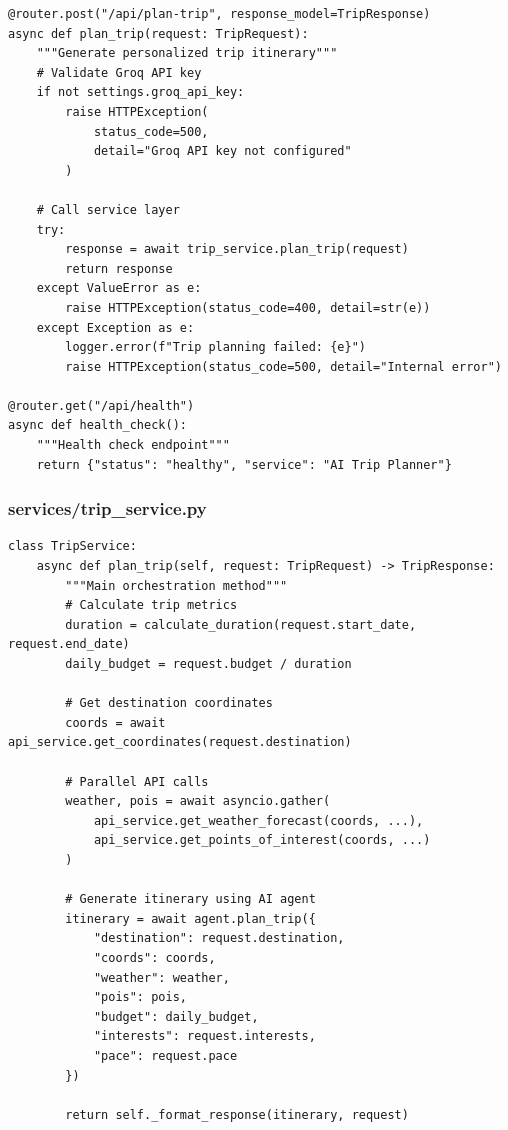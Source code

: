 \documentclass[12pt,a4paper]{report}
\begin{document}
\begin{lstlisting}[style=pythonstyle, caption={API Route Definitions}]
@router.post("/api/plan-trip", response_model=TripResponse)
async def plan_trip(request: TripRequest):
    """Generate personalized trip itinerary"""
    # Validate Groq API key
    if not settings.groq_api_key:
        raise HTTPException(
            status_code=500,
            detail="Groq API key not configured"
        )
    
    # Call service layer
    try:
        response = await trip_service.plan_trip(request)
        return response
    except ValueError as e:
        raise HTTPException(status_code=400, detail=str(e))
    except Exception as e:
        logger.error(f"Trip planning failed: {e}")
        raise HTTPException(status_code=500, detail="Internal error")

@router.get("/api/health")
async def health_check():
    """Health check endpoint"""
    return {"status": "healthy", "service": "AI Trip Planner"}
\end{lstlisting}

\subsubsection{services/trip\_service.py}

\begin{lstlisting}[style=pythonstyle, caption={Trip Service Orchestration}]
class TripService:
    async def plan_trip(self, request: TripRequest) -> TripResponse:
        """Main orchestration method"""
        # Calculate trip metrics
        duration = calculate_duration(request.start_date, request.end_date)
        daily_budget = request.budget / duration
        
        # Get destination coordinates
        coords = await api_service.get_coordinates(request.destination)
        
        # Parallel API calls
        weather, pois = await asyncio.gather(
            api_service.get_weather_forecast(coords, ...),
            api_service.get_points_of_interest(coords, ...)
        )
        
        # Generate itinerary using AI agent
        itinerary = await agent.plan_trip({
            "destination": request.destination,
            "coords": coords,
            "weather": weather,
            "pois": pois,
            "budget": daily_budget,
            "interests": request.interests,
            "pace": request.pace
        })
        
        return self._format_response(itinerary, request)
\end{lstlisting}
\end{document}
